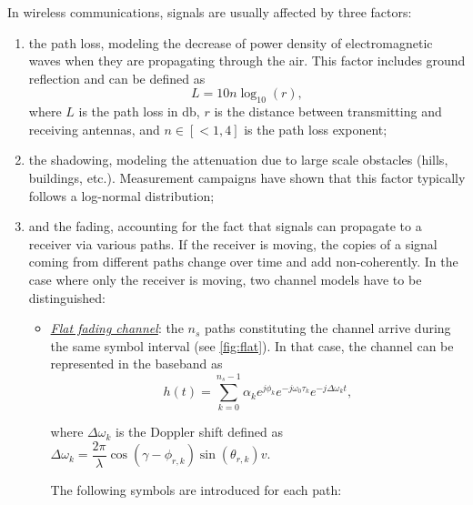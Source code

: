 \documentclass [a4paper, 11pt] {article}
\begin{document}
    \makesessiontitle
    
    \begin{reminder}
    
    In wireless communications, signals are usually affected by three factors: 

    \begin{enumerate}
        \item the path loss, modeling the decrease of power density of electromagnetic waves when they are propagating through the air. This factor includes ground reflection and can be defined as
        \begin{equation}
            L = 10n\log_{10}(r),
        \end{equation}
        where $L$ is the path loss in \si{\decibel}, $r$ is the distance between transmitting and receiving antennas, and $n \in [<1,4]$ is the path loss exponent;
        \item the shadowing, modeling the attenuation due to large scale obstacles (hills, buildings, etc.). Measurement campaigns have shown that this factor typically follows a log-normal distribution;
        \item and the fading, accounting for the fact that signals can propagate to a receiver via various paths. If the receiver is moving, the copies of a signal coming from different paths change over time and add non-coherently. In the case where only the receiver is moving, two channel models have to be distinguished:
        
        \begin{itemize}
            \item \underline{\textit{Flat fading channel}}: the $n_s$ paths constituting the channel arrive during the same symbol interval (see \autoref{fig:flat}). In that case, the channel can be represented in the baseband as
            \begin{equation}
                h(t) = \sum_{k=0}^{n_s - 1} \alpha_k e^{j\phi_k}e^{-j\omega_0 \tau_k}
                e^{-j\Delta \omega_k t},
            \end{equation}
        
        where $\Delta \omega_k$ is the Doppler shift defined as 
        $\Delta \omega_k = \dfrac{2\pi}{\lambda}\cos(\gamma - \phi_{r,k})\sin(\theta_{r,k})v$.
        
        The following symbols are introduced for each path:
        

\end{itemize}
\end{enumerate}
\end{reminder}
\end{document}
